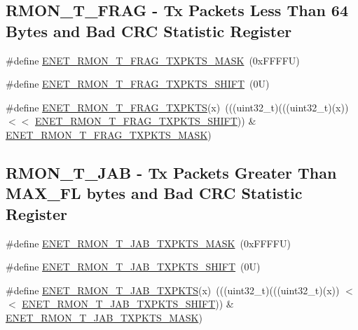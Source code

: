 \subsection*{R\+M\+O\+N\+\_\+\+T\+\_\+\+F\+R\+AG -\/ Tx Packets Less Than 64 Bytes and Bad C\+RC Statistic Register}
\begin{DoxyCompactItemize}
\item 
\#define \mbox{\hyperlink{group___e_n_e_t___register___masks_ga165675b1bc4ead102b209af312a64e30}{E\+N\+E\+T\+\_\+\+R\+M\+O\+N\+\_\+\+T\+\_\+\+F\+R\+A\+G\+\_\+\+T\+X\+P\+K\+T\+S\+\_\+\+M\+A\+SK}}~(0x\+F\+F\+F\+F\+U)
\item 
\#define \mbox{\hyperlink{group___e_n_e_t___register___masks_gaaab8a0b71f5d34f28a4fc9c1cefd6c21}{E\+N\+E\+T\+\_\+\+R\+M\+O\+N\+\_\+\+T\+\_\+\+F\+R\+A\+G\+\_\+\+T\+X\+P\+K\+T\+S\+\_\+\+S\+H\+I\+FT}}~(0\+U)
\item 
\#define \mbox{\hyperlink{group___e_n_e_t___register___masks_ga010507349cf682b907697293a4302774}{E\+N\+E\+T\+\_\+\+R\+M\+O\+N\+\_\+\+T\+\_\+\+F\+R\+A\+G\+\_\+\+T\+X\+P\+K\+TS}}(x)~(((uint32\+\_\+t)(((uint32\+\_\+t)(x)) $<$$<$ \mbox{\hyperlink{group___e_n_e_t___register___masks_gaaab8a0b71f5d34f28a4fc9c1cefd6c21}{E\+N\+E\+T\+\_\+\+R\+M\+O\+N\+\_\+\+T\+\_\+\+F\+R\+A\+G\+\_\+\+T\+X\+P\+K\+T\+S\+\_\+\+S\+H\+I\+FT}})) \& \mbox{\hyperlink{group___e_n_e_t___register___masks_ga165675b1bc4ead102b209af312a64e30}{E\+N\+E\+T\+\_\+\+R\+M\+O\+N\+\_\+\+T\+\_\+\+F\+R\+A\+G\+\_\+\+T\+X\+P\+K\+T\+S\+\_\+\+M\+A\+SK}})
\end{DoxyCompactItemize}
\subsection*{R\+M\+O\+N\+\_\+\+T\+\_\+\+J\+AB -\/ Tx Packets Greater Than M\+A\+X\+\_\+\+FL bytes and Bad C\+RC Statistic Register}
\begin{DoxyCompactItemize}
\item 
\#define \mbox{\hyperlink{group___e_n_e_t___register___masks_ga94c366b90093533c7f2149d62fa72133}{E\+N\+E\+T\+\_\+\+R\+M\+O\+N\+\_\+\+T\+\_\+\+J\+A\+B\+\_\+\+T\+X\+P\+K\+T\+S\+\_\+\+M\+A\+SK}}~(0x\+F\+F\+F\+F\+U)
\item 
\#define \mbox{\hyperlink{group___e_n_e_t___register___masks_gac8ba73230f05449d87137e0a0c32d72a}{E\+N\+E\+T\+\_\+\+R\+M\+O\+N\+\_\+\+T\+\_\+\+J\+A\+B\+\_\+\+T\+X\+P\+K\+T\+S\+\_\+\+S\+H\+I\+FT}}~(0\+U)
\item 
\#define \mbox{\hyperlink{group___e_n_e_t___register___masks_ga708fa1bfbc3cf03da5b4beb7a24b8e67}{E\+N\+E\+T\+\_\+\+R\+M\+O\+N\+\_\+\+T\+\_\+\+J\+A\+B\+\_\+\+T\+X\+P\+K\+TS}}(x)~(((uint32\+\_\+t)(((uint32\+\_\+t)(x)) $<$$<$ \mbox{\hyperlink{group___e_n_e_t___register___masks_gac8ba73230f05449d87137e0a0c32d72a}{E\+N\+E\+T\+\_\+\+R\+M\+O\+N\+\_\+\+T\+\_\+\+J\+A\+B\+\_\+\+T\+X\+P\+K\+T\+S\+\_\+\+S\+H\+I\+FT}})) \& \mbox{\hyperlink{group___e_n_e_t___register___masks_ga94c366b90093533c7f2149d62fa72133}{E\+N\+E\+T\+\_\+\+R\+M\+O\+N\+\_\+\+T\+\_\+\+J\+A\+B\+\_\+\+T\+X\+P\+K\+T\+S\+\_\+\+M\+A\+SK}})
\end{DoxyCompactItemize}
